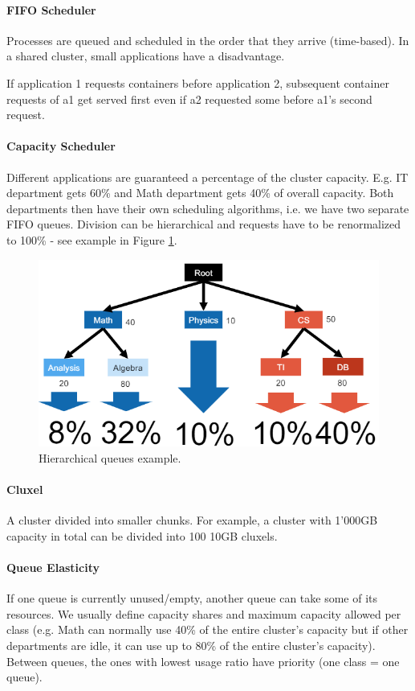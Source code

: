 \paragraph{FIFO Scheduler}
Processes are queued and scheduled in the order that they arrive (time-based). In a shared cluster, small applications have a disadvantage.

If application 1 requests containers before application 2, subsequent container requests of a1 get served first even if a2 requested some before a1's second request.

\paragraph{Capacity Scheduler}
Different applications are guaranteed a percentage of the cluster capacity. E.g. IT department gets 60\% and Math department gets 40\% of overall capacity. Both departments then have their own scheduling algorithms, i.e. we have two separate FIFO queues. Division can be hierarchical and requests have to be renormalized to 100\% - see example in Figure \ref{fig:capsched}.

\begin{figure}[h]
	\centering
	\includegraphics[scale=0.7]{images/4-capsched.PNG}
	\caption{Hierarchical queues example.}
	\label{fig:capsched}
\end{figure}

\paragraph{Cluxel}
A cluster divided into smaller chunks. For example, a cluster with 1'000GB capacity in total can be divided into 100 10GB cluxels.

\paragraph{Queue Elasticity}
If one queue is currently unused/empty, another queue can take some of its resources. We usually define capacity shares and maximum capacity allowed per class (e.g. Math can normally use 40\% of the entire cluster's capacity but if other departments are idle, it can use up to 80\% of the entire cluster's capacity). Between queues, the ones with lowest usage ratio have priority (one class = one queue).

